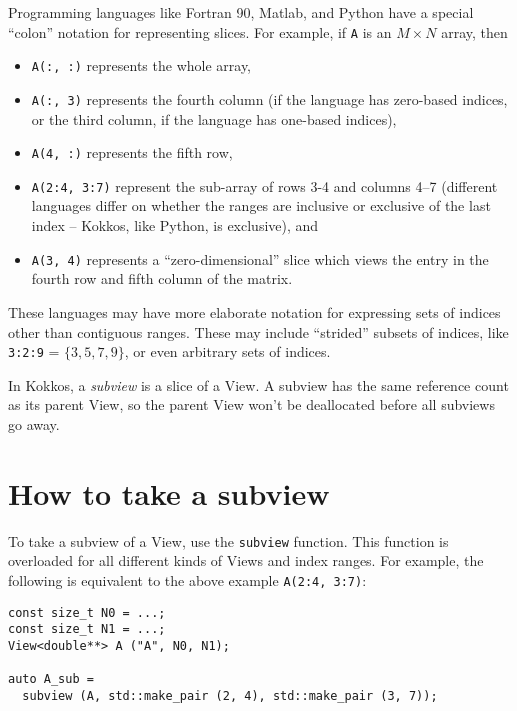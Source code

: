 Programming languages like Fortran 90, Matlab, and Python have a
special ``colon'' notation for representing slices.  For example, if
\texttt{A} is an $M \times N$ array, then
\begin{itemize}
\item \texttt{A(:, :)} represents the whole array,
\item \texttt{A(:, 3)} represents the fourth column (if the language
  has zero-based indices, or the third column, if the language has
  one-based indices),
\item \texttt{A(4, :)} represents the fifth row, 
\item \texttt{A(2:4, 3:7)} represent the sub-array of rows 3-4 and
  columns 4--7 (different languages differ on whether the ranges are
  inclusive or exclusive of the last index -- Kokkos, like Python, is
  exclusive), and
\item \texttt{A(3, 4)} represents a ``zero-dimensional'' slice which
  views the entry in the fourth row and fifth column of the matrix.
\end{itemize}
These languages may have more elaborate notation for expressing sets
of indices other than contiguous ranges.  These may include
``strided'' subsets of indices, like \texttt{3:2:9} = $\{ 3, 5, 7, 9
\}$, or even arbitrary sets of indices.

In Kokkos, a \emph{subview} is a slice of a View.  A subview has the
same reference count as its parent View, so the parent View won't be
deallocated before all subviews go away.

\section{How to take a subview}\label{S:Subviews:How}

To take a subview of a View, use the \texttt{subview} function.  This
function is overloaded for all different kinds of Views and index
ranges.  For example, the following is equivalent to the above example
\texttt{A(2:4, 3:7)}:

\begin{lstlisting}
const size_t N0 = ...;
const size_t N1 = ...;
View<double**> A ("A", N0, N1);

auto A_sub = 
  subview (A, std::make_pair (2, 4), std::make_pair (3, 7));
\end{lstlisting}

